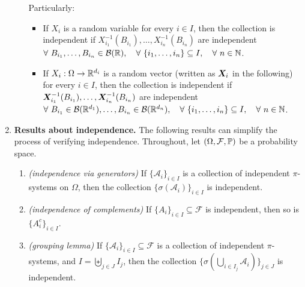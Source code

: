 \begin{enumerate}
\begin{enumerate}
Particularly:
\begin{itemize}
\item If \(X_i\) is a random variable for every \(i\in I\), then the collection
is independent if \(X_{i_1}^{-1}(B_{i_1}),\dotsc,X_{i_n}^{-1}(B_{i_n})\) are
independent
\(\forall~B_{i_1},\dotsc,B_{i_n}\in\mathcal{B}(\mathbb{R}),\quad
\forall~\{i_{1},\dotsc,i_{n}\}\subseteq I,\quad
\forall~n\in\mathbb{N}\).
\item If \(X_i:\Omega\to\mathbb{R}^{d_i}\) is a random vector (written as \(\bm{X}_i\) in the
following) for every \(i\in I\), then the collection is independent if
\(\bm{X}_{i_1}^{-1}(B_{i_1}),\dotsc,\bm{X}_{i_n}^{-1}(B_{i_n})\) are independent
\(\forall~B_{i_1}\in\mathcal{B}(\mathbb{R}^{d_1}),\dotsc,B_{i_n}\in\mathcal{B}(\mathbb{R}^{d_n}),\quad
\forall~\{i_{1},\dotsc,i_{n}\}\subseteq I,\quad
\forall~n\in\mathbb{N}\).
\end{itemize}
\end{enumerate}
\item \textbf{Results about independence.} The following results can simplify
the process of verifying independence. Throughout, let
\((\Omega,\mathcal{F},\mathbb{P})\) be a probability space.
\begin{enumerate}
\item \label{it:ind-via-gen} \emph{(independence via generators)} If
\(\{\mathcal{A}_{i}\}_{i\in I}\) is a collection of independent \(\pi\)-systems
on \(\Omega\), then the collection \(\{\sigma(\mathcal{A}_i)\}_{i\in I}\) is
independent.
\item \label{it:ind-comp} \emph{(independence of complements)} If \(\{A_{i}\}_{i\in I}\subseteq \mathcal{F}\)
is independent, then so is \(\{A_{i}^c\}_{i\in I}\).
\item \label{it:grouping-lma} \emph{(grouping lemma)} If \(\{\mathcal{A}_{i}\}_{i\in
I}\subseteq \mathcal{F}\) is a collection of independent \(\pi\)-systems, and
\(I=\biguplus_{j\in J}^{}I_j\), then the collection \(\{\sigma(\bigcup_{i\in
I_j}^{}\mathcal{A}_i)\}_{j\in J}\) is independent.
\begin{center}
\end{center}
\end{enumerate}
\end{enumerate}
